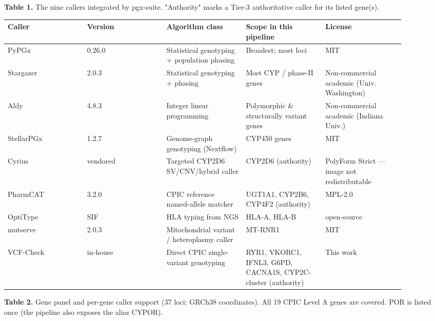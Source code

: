 \documentclass[11pt]{article}
\begin{document}
\textbf{Table 1.} The nine callers integrated by pgx-suite. "Authority" marks a Tier-3 authoritative caller for its listed gene(s).

\begin{longtable}{p{0.18\linewidth}p{0.18\linewidth}p{0.18\linewidth}p{0.18\linewidth}p{0.18\linewidth}}
\hline
\textbf{Caller} & \textbf{Version} & \textbf{Algorithm class} & \textbf{Scope in this pipeline} & \textbf{License} \\ \hline\endhead
PyPGx & 0.26.0 & Statistical genotyping + population phasing & Broadest; most loci & MIT \\
Stargazer & 2.0.3 & Statistical genotyping + phasing & Most CYP / phase-II genes & Non-commercial academic (Univ. Washington) \\
Aldy & 4.8.3 & Integer linear programming & Polymorphic \& structurally variant genes & Non-commercial academic (Indiana Univ.) \\
StellarPGx & 1.2.7 & Genome-graph genotyping (Nextflow) & CYP450 genes & MIT \\
Cyrius & vendored & Targeted CYP2D6 SV/CNV/hybrid caller & CYP2D6 (authority) & PolyForm Strict --- image not redistributable \\
PharmCAT & 3.2.0 & CPIC reference named-allele matcher & UGT1A1, CYP2B6, CYP4F2 (authority) & MPL-2.0 \\
OptiType & SIF & HLA typing from NGS & HLA-A, HLA-B & open-source \\
mutserve & 2.0.3 & Mitochondrial variant / heteroplasmy caller & MT-RNR1 & MIT \\
VCF-Check & in-house & Direct CPIC single-variant genotyping & RYR1, VKORC1, IFNL3, G6PD, CACNA1S, CYP2C-cluster (authority) & This work \\
\hline
\end{longtable}

\textbf{Table 2.} Gene panel and per-gene caller support (37 loci; GRCh38 coordinates). All 19 CPIC Level A genes are covered. POR is listed once (the pipeline also exposes the alias CYPOR).
\end{document}
